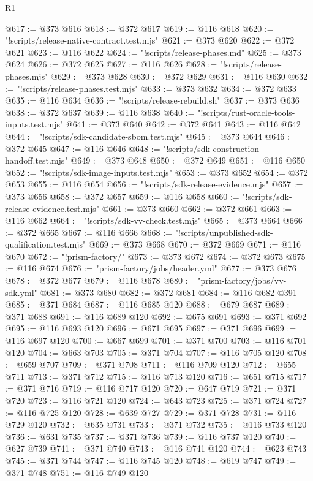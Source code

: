 \begin{lexlean}{R1}
\begin{coremodule}
@617 := @373 @616
@618 := @372 @617
@619 := @116 @618
@620 := "!scripts/release-native-contract.test.mjs"
@621 := @373 @620
@622 := @372 @621
@623 := @116 @622
@624 := "!scripts/release-phases.md"
@625 := @373 @624
@626 := @372 @625
@627 := @116 @626
@628 := "!scripts/release-phases.mjs"
@629 := @373 @628
@630 := @372 @629
@631 := @116 @630
@632 := "!scripts/release-phases.test.mjs"
@633 := @373 @632
@634 := @372 @633
@635 := @116 @634
@636 := "!scripts/release-rebuild.sh"
@637 := @373 @636
@638 := @372 @637
@639 := @116 @638
@640 := "!scripts/rust-oracle-tools-inputs.test.mjs"
@641 := @373 @640
@642 := @372 @641
@643 := @116 @642
@644 := "!scripts/sdk-candidate-sbom.test.mjs"
@645 := @373 @644
@646 := @372 @645
@647 := @116 @646
@648 := "!scripts/sdk-construction-handoff.test.mjs"
@649 := @373 @648
@650 := @372 @649
@651 := @116 @650
@652 := "!scripts/sdk-image-inputs.test.mjs"
@653 := @373 @652
@654 := @372 @653
@655 := @116 @654
@656 := "!scripts/sdk-release-evidence.mjs"
@657 := @373 @656
@658 := @372 @657
@659 := @116 @658
@660 := "!scripts/sdk-release-evidence.test.mjs"
@661 := @373 @660
@662 := @372 @661
@663 := @116 @662
@664 := "!scripts/sdk-vv-check.test.mjs"
@665 := @373 @664
@666 := @372 @665
@667 := @116 @666
@668 := "!scripts/unpublished-sdk-qualification.test.mjs"
@669 := @373 @668
@670 := @372 @669
@671 := @116 @670
@672 := "!prism-factory/"
@673 := @373 @672
@674 := @372 @673
@675 := @116 @674
@676 := "prism-factory/jobs/header.yml"
@677 := @373 @676
@678 := @372 @677
@679 := @116 @678
@680 := "prism-factory/jobs/vv-sdk.yml"
@681 := @373 @680
@682 := @372 @681
@684 := @116 @682 @391
@685 := @371 @684
@687 := @116 @685 @120
@688 := @679 @687
@689 := @371 @688
@691 := @116 @689 @120
@692 := @675 @691
@693 := @371 @692
@695 := @116 @693 @120
@696 := @671 @695
@697 := @371 @696
@699 := @116 @697 @120
@700 := @667 @699
@701 := @371 @700
@703 := @116 @701 @120
@704 := @663 @703
@705 := @371 @704
@707 := @116 @705 @120
@708 := @659 @707
@709 := @371 @708
@711 := @116 @709 @120
@712 := @655 @711
@713 := @371 @712
@715 := @116 @713 @120
@716 := @651 @715
@717 := @371 @716
@719 := @116 @717 @120
@720 := @647 @719
@721 := @371 @720
@723 := @116 @721 @120
@724 := @643 @723
@725 := @371 @724
@727 := @116 @725 @120
@728 := @639 @727
@729 := @371 @728
@731 := @116 @729 @120
@732 := @635 @731
@733 := @371 @732
@735 := @116 @733 @120
@736 := @631 @735
@737 := @371 @736
@739 := @116 @737 @120
@740 := @627 @739
@741 := @371 @740
@743 := @116 @741 @120
@744 := @623 @743
@745 := @371 @744
@747 := @116 @745 @120
@748 := @619 @747
@749 := @371 @748
@751 := @116 @749 @120

\end{coremodule}
\end{lexlean}
